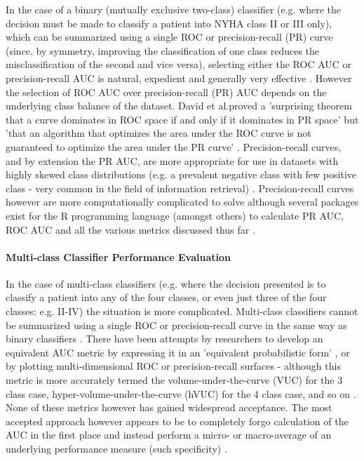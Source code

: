 \documentclass[]{article}
\begin{document}
In the case of a binary (mutually exclusive two-class) classifier (e.g. where the decision must be made to classify a patient into NYHA class II or III only), which can be summarized using a single ROC or precision-recall (PR) curve (since, by symmetry, improving the classification of one class reduces the misclassification of the second and vice versa), selecting either the ROC AUC or precision-recall AUC is natural, expedient and generally very effective \cite{Davis2006,Flach2004,MedCalc2017,Sayad}. However the selection of ROC AUC over precision-recall (PR) AUC depends on the underlying class balance of the dataset. David et al.\@ proved a 'surprising theorem that a curve dominates in ROC space if and only if it dominates in PR space' but 'that an algorithm that optimizes the area under the ROC curve is not guaranteed to optimize the area under the PR curve' \cite{Davis2006}. Precision-recall curves, and by extension the PR AUC, are more appropriate for use in datasets with highly skewed class distributions (e.g. a prevalent negative class with few positive class - very common in the field of information retrieval) \cite{Davis2006,Flach2004,Sokolova2009}. Precision-recall curves however are more computationally complicated to solve although several packages exist for the R programming language (amongst others) to calculate PR AUC, ROC AUC and all the various metrics discussed thus far \cite{Robin2017,Yan2016}.

\paragraph{Multi-class Classifier Performance Evaluation}

In the case of multi-class classifiers (e.g. where the decision presented is to classify a patient into any of the four classes, or even just three of the four classes: e.g. II-IV) the situation is more complicated. Multi-class classifiers cannot be summarized using a single ROC or precision-recall curve in the same way as binary classifiers \cite{Sokolova2009,Flach2004,Fieldsend2005,Hand2001a,Hyndman2010,Kautz2017}. There have been attempts by researchers to develop an equivalent AUC metric by expressing it in an 'equivalent probabilistic form' \cite{Hand2001a}, or by plotting multi-dimensional ROC or precision-recall surfaces - although this metric is more accurately termed the volume-under-the-curve (VUC) for the 3 class case, hyper-volume-under-the-curve (hVUC) for the 4 class case, and so on \cite{Fieldsend2005}. None of these metrics however has gained widespread acceptance. The most accepted approach however appears to be to completely forgo calculation of the AUC in the first place and instead perform a micro- or macro-average of an underlying performance measure (such specificity) \cite{Flach2004,Sokolova2009,Hyndman2010}. 
\end{document}
